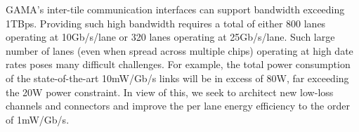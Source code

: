 \noindent
GAMA's inter-tile communication interfaces can support bandwidth exceeding 1TBps.
Providing such high bandwidth requires a total of either 800 lanes operating at 10Gb/s/lane or 320 lanes operating at 25Gb/s/lane.  
Such large number of lanes (even when spread across multiple chips) operating at high date rates poses many difficult challenges. 
For example, the total power consumption of the state-of-the-art 10mW/Gb/s links will be in excess of 80W, 
far exceeding the 20W power constraint.
In view of this, we seek to architect new low-loss channels and connectors and improve the per lane energy efficiency to the order of 1mW/Gb/s. 


